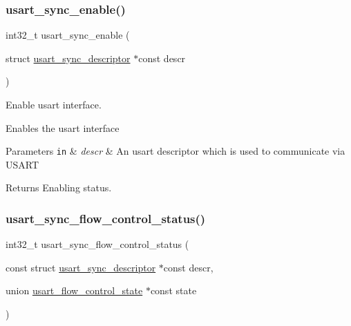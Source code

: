 \subsubsection{\texorpdfstring{usart\+\_\+sync\+\_\+enable()}{usart\_sync\_enable()}}
{\footnotesize\ttfamily int32\+\_\+t usart\+\_\+sync\+\_\+enable (\begin{DoxyParamCaption}\item[{struct \hyperlink{structusart__sync__descriptor}{usart\+\_\+sync\+\_\+descriptor} $\ast$const}]{descr }\end{DoxyParamCaption})}



Enable usart interface. 

Enables the usart interface


\begin{DoxyParams}[1]{Parameters}
\mbox{\tt in}  & {\em descr} & An usart descriptor which is used to communicate via U\+S\+A\+RT\\
\hline
\end{DoxyParams}
\begin{DoxyReturn}{Returns}
Enabling status. 
\end{DoxyReturn}
\mbox{\label{group__doc__driver__hal__usart__sync_ga34932fa96b2190715b37f2c2c784a2f4}} 
\subsubsection{\texorpdfstring{usart\+\_\+sync\+\_\+flow\+\_\+control\+\_\+status()}{usart\_sync\_flow\_control\_status()}}
{\footnotesize\ttfamily int32\+\_\+t usart\+\_\+sync\+\_\+flow\+\_\+control\+\_\+status (\begin{DoxyParamCaption}\item[{const struct \hyperlink{structusart__sync__descriptor}{usart\+\_\+sync\+\_\+descriptor} $\ast$const}]{descr,  }\item[{union \hyperlink{unionusart__flow__control__state}{usart\+\_\+flow\+\_\+control\+\_\+state} $\ast$const}]{state }\end{DoxyParamCaption})}



